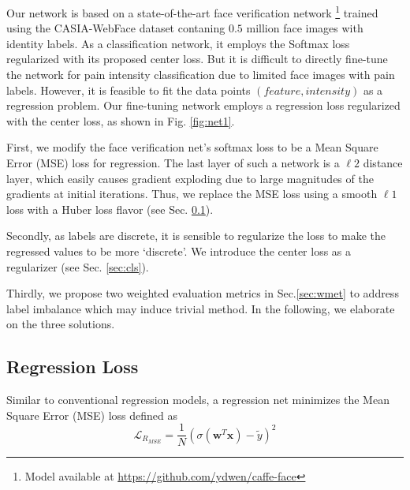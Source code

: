 \documentclass{article}
\begin{document}
Our network is based on a state-of-the-art face verification network \cite{wen2016discriminative}\footnote{Model available at \url{https://github.com/ydwen/caffe-face}} trained using the CASIA-WebFace dataset contaning $0.5$ million face images with identity labels. 
As a classification network, it employs the Softmax loss regularized with its proposed center loss.
But it is difficult to directly fine-tune the network for pain intensity classification due to limited face images with pain labels.
However, it is feasible to fit the data points $(feature, intensity)$ as a regression problem.
Our fine-tuning network employs a regression loss regularized with the center loss,
as shown in Fig. \ref{fig:net1}.

First, we modify the face verification net's softmax loss to be a Mean Square Error (MSE) loss for regression.
The last layer of such a network is a $\ell 2$ distance layer,
which easily causes gradient exploding due to
large magnitudes of the gradients at initial iterations.
Thus, we replace the MSE loss using
a smooth $\ell 1$ loss with a Huber loss flavor (see Sec. \ref{sec:regloss}).

Secondly, as labels are discrete, 
it is sensible to regularize the loss to make the regressed values to be more ‘discrete’. 
We introduce the center loss \cite{wen2016discriminative} as a regularizer (see Sec. \ref{sec:cls}).

Thirdly, we propose two weighted evaluation metrics in Sec.\ref{sec:wmet} to address label imbalance which may induce trivial method. In the following, we elaborate on the three solutions.
     


\subsection{Regression Loss}\label{sec:regloss}
Similar to conventional regression models, a regression net minimizes the Mean Square Error (MSE) loss defined as
\begin{equation}
    \mathcal{L}_{R_{MSE}} = \frac{1}{N} ( \sigma(\mathbf{w}^T \mathbf{x}) - \tilde{y} )^2
\end{equation}
\label{eqn:regloss}
\vspace{-3mm}
\end{document}
